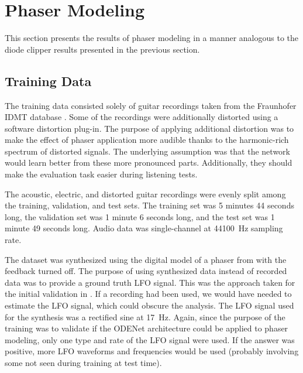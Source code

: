 \section{Phaser Modeling}

This section presents the results of phaser modeling in a manner analogous to the diode clipper results presented in the previous section.

\subsection{Training Data}
\label{sec:phaser_training_data}

The training data consisted solely of guitar recordings taken from the Fraunhofer IDMT database \cite{Kehling2014}. Some of the recordings were additionally distorted using a software distortion plug-in. The purpose of applying additional distortion was to make the effect of phaser application more audible thanks to the harmonic-rich spectrum of distorted signals. The underlying assumption was that the network would learn better from these more pronounced parts. Additionally, they should make the evaluation task easier during listening tests. 

The acoustic, electric, and distorted guitar recordings were evenly split among the training, validation, and test sets. The training set was 5 minutes 44 seconds long, the validation set was 1 minute 6 seconds long, and the test set was 1 minute 49 seconds long. Audio data was single-channel at \SI{44100}{Hz} sampling rate.

The dataset was synthesized using the digital model of a phaser from \cite{Kiiski2016} with the feedback turned off. The purpose of using synthesized data instead of recorded data was to provide a ground truth LFO signal. This was the approach taken for the initial validation in \cite{Wright2020}. If a recording had been used, we would have needed to estimate the LFO signal, which could obscure the analysis. The LFO signal used for the synthesis was a rectified sine at \SI{17}{Hz}. Again, since the purpose of the training was to validate if the ODENet architecture could be applied to phaser modeling, only one type and rate of the LFO signal were used. If the answer was positive, more LFO waveforms and frequencies would be used (probably involving some not seen during training at test time). 

